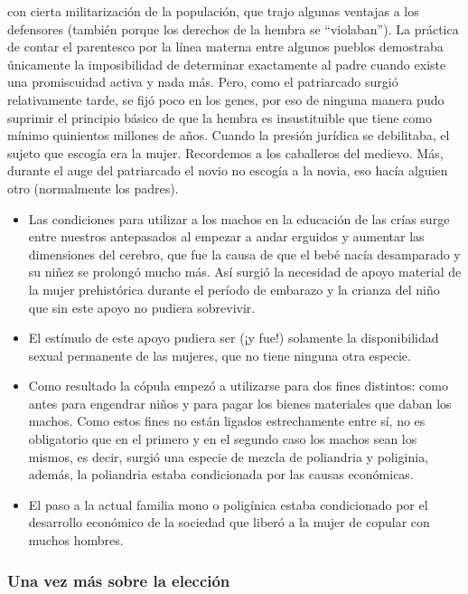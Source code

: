 con cierta militarización de la populación, que trajo algunas ventajas a
los defensores (también porque los derechos de la hembra se
``violaban''). La práctica de contar el parentesco por la línea materna
entre algunos pueblos demostraba únicamente la imposibilidad de
determinar exactamente al padre cuando existe una promiscuidad activa y
nada más. Pero, como el patriarcado surgió relativamente tarde, se fijó
poco en los genes, por eso de ninguna manera pudo suprimir el principio
básico de que la hembra es insustituible que tiene como mínimo
quinientos millones de años. Cuando la presión jurídica se debilitaba,
el sujeto que escogía era la mujer. Recordemos a los caballeros del
medievo. Más, durante el auge del patriarcado el novio no escogía a la
novia, eso hacía alguien otro (normalmente los padres).

\begin{itemize}
\tightlist
\item
  Las condiciones para utilizar a los machos en la educación de las
  crías surge entre nuestros antepasados al empezar a andar erguidos y
  aumentar las dimensiones del cerebro, que fue la causa de que el bebé
  nacía desamparado y su niñez se prolongó mucho más. Así surgió la
  necesidad de apoyo material de la mujer prehistórica durante el
  período de embarazo y la crianza del niño que sin este apoyo no
  pudiera sobrevivir.
\item
  El estímulo de este apoyo pudiera ser (¡y fue!) solamente la
  disponibilidad sexual permanente de las mujeres, que no tiene ninguna
  otra especie.
\item
  Como resultado la cópula empezó a utilizarse para dos fines distintos:
  como antes para engendrar niños y para pagar los bienes materiales que
  daban los machos. Como estos fines no están ligados estrechamente
  entre sí, no es obligatorio que en el primero y en el segundo caso los
  machos sean los mismos, es decir, surgió una especie de mezcla de
  poliandria y poliginia, además, la poliandria estaba condicionada por
  las causas económicas.
\item
  El paso a la actual familia mono o poligínica estaba condicionado por
  el desarrollo económico de la sociedad que liberó a la mujer de
  copular con muchos hombres.
\end{itemize}

\protect\hypertarget{M16}{}{}

\hypertarget{una-vez-muxe1s-sobre-la-elecciuxf3n}{\subsubsection{Una vez
más sobre la elección}\label{una-vez-muxe1s-sobre-la-elecciuxf3n}}

